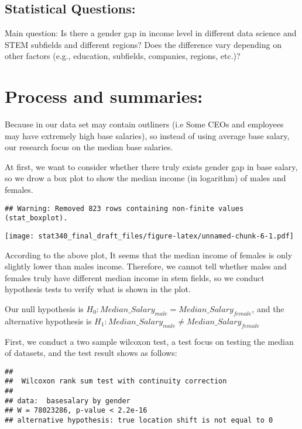 \documentclass[
]{article}
\begin{document}
\hypertarget{statistical-questions}{%
\subsection{Statistical Questions:}\label{statistical-questions}}

Main question: Is there a gender gap in income level in different data
science and STEM subfields and different regions? Does the difference
vary depending on other factors (e.g., education, subfields, companies,
regions, etc.)?

\hypertarget{process-and-summaries}{%
\section{Process and summaries:}\label{process-and-summaries}}

Because in our data set may contain outliners (i.e Some CEOs and
employees may have extremely high base salaries), so instead of using
average base salary, our research focus on the median base salaries.

At first, we want to consider whether there truly exists gender gap in
base salary, so we drow a box plot to show the median income (in
logarithm) of males and females.

\begin{verbatim}
## Warning: Removed 823 rows containing non-finite values (stat_boxplot).
\end{verbatim}

\texttt{[image: stat340\_final\_draft\_files/figure-latex/unnamed-chunk-6-1.pdf]}

According to the above plot, It seems that the median income of females
is only slightly lower than males income. Therefore, we cannot tell
whether males and females truly have different median income in stem
fields, so we conduct hypothesis tests to verify what is shown in the
plot.

Our null hypothesis is
\(H_0 : Median\_Salary_{male} = Median\_Salary_{female}\), and the
alternative hypothesis is
\(H_1: Median\_Salary_{male} \neq Median\_Salary_{female}\)

First, we conduct a two sample wilcoxon test, a test focus on testing
the median of datasets, and the test result shows as follows:

\begin{verbatim}
## 
##  Wilcoxon rank sum test with continuity correction
## 
## data:  basesalary by gender
## W = 78023286, p-value < 2.2e-16
## alternative hypothesis: true location shift is not equal to 0
\end{verbatim}
\end{document}
